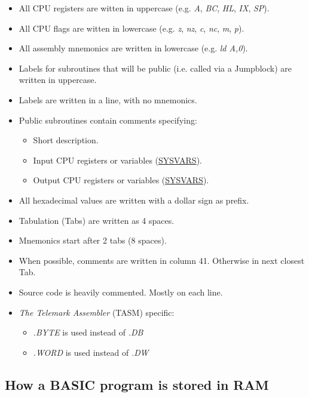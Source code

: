     \begin{itemize}
        \item All CPU registers are witten in uppercase (e.g. \textit{A},
        \textit{BC}, \textit{HL}, \textit{IX}, \textit{SP}).
        \item All CPU flags are witten in lowercase (e.g. \textit{z},
        \textit{nz}, \textit{c}, \textit{nc}, \textit{m}, \textit{p}).
        \item All assembly mnemonics are written in lowercase (e.g. 
        \textit{ld A,0}).
        \item Labels for subroutines that will be public (i.e. called via a
        Jumpblock) are written in uppercase.
        \item Labels are written in a line, with no mnemonics.
        \item Public subroutines contain comments specifying:
        \begin{itemize}
            \item Short description.
            \item Input CPU registers or variables (\hyperref[sec:ram_memmap]{SYSVARS}).
            \item Output CPU registers or variables (\hyperref[sec:ram_memmap]{SYSVARS}).
        \end{itemize}
        \item All hexadecimal values are written with a dollar sign as prefix.
        \item Tabulation (Tabs) are written as 4 spaces.
        \item Mnemonics start after 2 tabs (8 spaces).
        \item When possible, comments are written in column 41. Otherwise in
        next closest Tab.
        \item Source code is heavily commented. Mostly on each line.
        \item \textit{The Telemark Assembler} (TASM) specific:
        \begin{itemize}
            \item \textit{.BYTE} is used instead of \textit{.DB}
            \item \textit{.WORD} is used instead of \textit{.DW}
        \end{itemize}
    \end{itemize}

    \subsection{How a BASIC program is stored in RAM}

